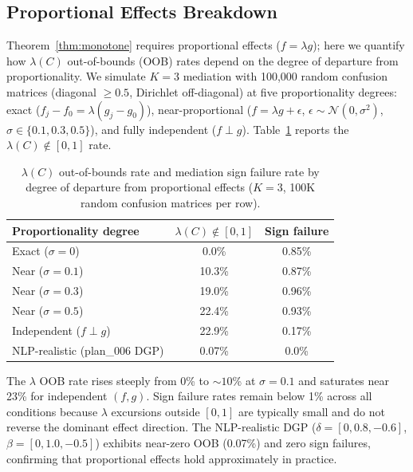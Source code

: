 \subsection{Proportional Effects Breakdown}
\label{sec:proportional_effects}

Theorem~\ref{thm:monotone} requires proportional effects ($f = \lambda g$); here we quantify how $\lambda(C)$ out-of-bounds (OOB) rates depend on the degree of departure from proportionality. We simulate $K{=}3$ mediation with 100{,}000 random confusion matrices (diagonal $\geq 0.5$, Dirichlet off-diagonal) at five proportionality degrees: exact ($f_j {-} f_0 = \lambda(g_j {-} g_0)$), near-proportional ($f = \lambda g + \epsilon$, $\epsilon \sim \mathcal{N}(0,\sigma^2)$, $\sigma \in \{0.1, 0.3, 0.5\}$), and fully independent ($f \perp g$). Table~\ref{tab:proportional_effects} reports the $\lambda(C) \notin [0,1]$ rate.

\begin{table}[h]
\centering
\small
\caption{$\lambda(C)$ out-of-bounds rate and mediation sign failure rate by degree of departure from proportional effects ($K{=}3$, 100K random confusion matrices per row).}
\label{tab:proportional_effects}
\begin{tabular}{lcc}
\toprule
\textbf{Proportionality degree} & $\lambda(C) \notin [0,1]$ & Sign failure \\
\midrule
Exact ($\sigma{=}0$) & 0.0\% & 0.85\% \\
Near ($\sigma{=}0.1$) & 10.3\% & 0.87\% \\
Near ($\sigma{=}0.3$) & 19.0\% & 0.96\% \\
Near ($\sigma{=}0.5$) & 22.4\% & 0.93\% \\
Independent ($f \perp g$) & 22.9\% & 0.17\% \\
\midrule
NLP-realistic (plan\_006 DGP) & 0.07\% & 0.0\% \\
\bottomrule
\end{tabular}
\end{table}

The $\lambda$ OOB rate rises steeply from 0\% to ${\sim}10$\% at $\sigma{=}0.1$ and saturates near 23\% for independent $(f,g)$. Sign failure rates remain below 1\% across all conditions because $\lambda$ excursions outside $[0,1]$ are typically small and do not reverse the dominant effect direction. The NLP-realistic DGP ($\delta{=}[0, 0.8, {-}0.6]$, $\beta{=}[0, 1.0, {-}0.5]$) exhibits near-zero OOB (0.07\%) and zero sign failures, confirming that proportional effects hold approximately in practice.

